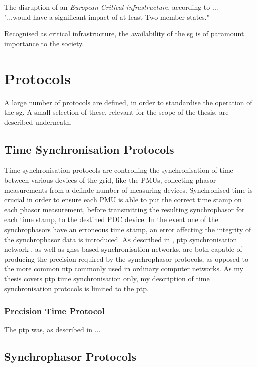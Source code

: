  The disruption of an \textit{European Critical infrastructure}, according to  \cite{eu2008council}... \\ "...would have a significant impact of at least Two member states."

Recognised as critical infrastructure, the availability of the \acrlong{sg} is of paramount importance to the society. 



\section{Protocols}
A large number of protocols are defined, in order to standardise the operation of the \acrlong{sg}.
A small selection of these, relevant for the scope of the thesis, are described underneath.


\subsection{Time Synchronisation Protocols}
Time synchronisation protocols are controlling the synchronisation of time between various devices of the grid, like the PMUs, collecting phasor measurements from a definde number of measuring devices. Synchronised time is crucial in order to ensure each PMU is able to put the correct time stamp on each phasor measurement, before transmitting the resulting synchrophasor for each time stamp, to the destined PDC device. In the event one of the synchrophasors have an erroneous time stamp, an error affecting the integrity of the synchrophasor data is introduced. As described in \cite{moussa2016security}, \acrlong{ptp} synchronisation network
, as well as \acrlong{gnss} based synchronisation networks, are both capable of producing the precision required by the synchrophasor protocols, as opposed to the more common \acrfull{ntp} commonly used in ordinary computer networks. As my thesis covers \acrshort{ptp} time synchronisation only, my description of time synchronisation protocols is limited to the \acrfull{ptp}.

\subsubsection{Precision Time Protocol}

The \acrfull{ptp} was, as described in \cite{alghamdi2021precision} ...




\subsection{Synchrophasor Protocols}

